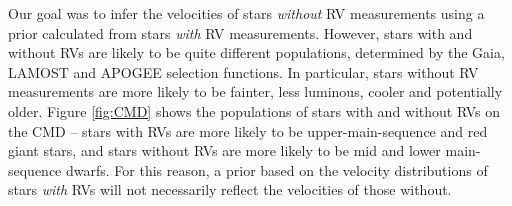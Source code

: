 Our goal was to infer the velocities of stars {\it without} RV measurements
using a prior calculated from stars {\it with} RV measurements.
However, stars with and without RVs are likely to be quite different
populations, determined by the Gaia, LAMOST and APOGEE selection functions.
In particular, stars without RV measurements are more likely to be fainter,
less luminous, cooler and potentially older.
Figure \ref{fig:CMD} shows the populations of stars with and without RVs on
the CMD -- stars with RVs are more likely to be upper-main-sequence and red
giant stars, and stars without RVs are more likely to be mid and lower
main-sequence dwarfs.
For this reason, a prior based on the velocity distributions of stars {\it
with} RVs will not necessarily reflect the velocities of those without.


